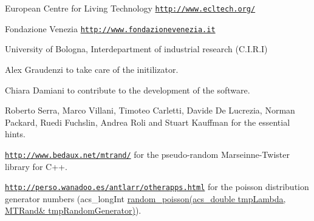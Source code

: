 \begin{DoxyItemize}
\item European Centre for Living Technology \href{http://www.ecltech.org/}{\tt http\-://www.\-ecltech.\-org/}
\item Fondazione Venezia \href{http://www.fondazionevenezia.it}{\tt http\-://www.\-fondazionevenezia.\-it}
\item University of Bologna, Interdepartment of industrial research (C.\-I.\-R.\-I)
\item Alex Graudenzi to take care of the initilizator.
\item Chiara Damiani to contribute to the development of the software.
\item Roberto Serra, Marco Villani, Timoteo Carletti, Davide De Lucrezia, Norman Packard, Ruedi Fuchslin, Andrea Roli and Stuart Kauffman for the essential hints.
\item \href{http://www.bedaux.net/mtrand/}{\tt http\-://www.\-bedaux.\-net/mtrand/} for the pseudo-\/random Marseinne-\/\-Twister library for C++.
\item \href{http://perso.wanadoo.es/antlarr/otherapps.html}{\tt http\-://perso.\-wanadoo.\-es/antlarr/otherapps.\-html} for the poisson distribution generator numbers (acs\-\_\-long\-Int \hyperlink{a00070_a22cddb6ffcf2250e0c90bc913728350f}{random\-\_\-poisson(acs\-\_\-double tmp\-Lambda, M\-T\-Rand\& tmp\-Random\-Generator)}). 
\end{DoxyItemize}